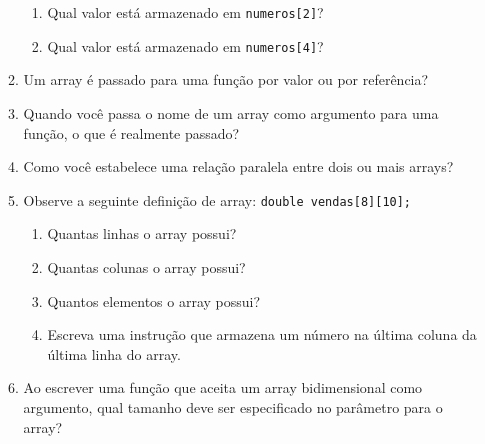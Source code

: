 \documentclass[12pt]{article}
\begin{document}
\begin{enumerate}
\begin{enumerate}
                        \begin{enumerate}
                              \item Qual valor está armazenado em \texttt{numeros[2]}?
                              \item Qual valor está armazenado em \texttt{numeros[4]}?
                        \end{enumerate}
                  \item Um array é passado para uma função por valor ou por referência?
                  \item Quando você passa o nome de um array como argumento para uma função, o que é realmente passado?
                  \item Como você estabelece uma relação paralela entre dois ou mais arrays?
                  \item Observe a seguinte definição de array: \texttt{double vendas[8][10];}
                        \begin{enumerate}
                              \item Quantas linhas o array possui?
                              \item Quantas colunas o array possui?
                              \item Quantos elementos o array possui?
                              \item Escreva uma instrução que armazena um número na última coluna da última linha do array.
                        \end{enumerate}
                  \item Ao escrever uma função que aceita um array bidimensional como argumento, qual tamanho deve ser especificado no parâmetro para o array?
            \end{enumerate}


\end{enumerate}
\end{document}
